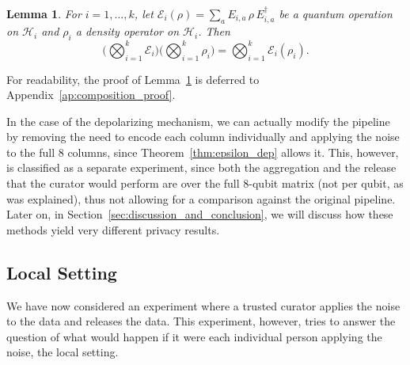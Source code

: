 \documentclass{ieeeaccess}
\newtheorem{lemma}{Lemma}[section]
\begin{document}
\begin{lemma}
  For $i = 1, \dots, k$, let $\mathcal{E}_i(\rho) = \sum_{a} E_{i,a}\, \rho\, E_{i,a}^{\dagger}$ be a quantum operation on $\mathcal{H}_i$ and $\rho_i$ a density operator on $\mathcal{H}_i$. Then
  \[
    \Big(\bigotimes_{i=1}^{k} \mathcal{E}_i\Big)\Big(\bigotimes_{i=1}^{k} \rho_i\Big) = \bigotimes_{i=1}^{k} \mathcal{E}_i(\rho_i).
  \]
  \label{lem:product_channel}
\end{lemma}

For readability, the proof of Lemma~\ref{lem:product_channel} is deferred to Appendix~\ref{ap:composition_proof}.

In the case of the depolarizing mechanism, we can actually modify the pipeline by removing the need to encode each column individually and applying the noise to the full 8 columns, since Theorem~\ref{thm:epsilon_dep} allows it. This, however, is classified as a separate experiment, since both the aggregation and the release that the curator would perform are over the full 8-qubit matrix (not per qubit, as was explained), thus not allowing for a comparison against the original pipeline. Later on, in Section~\ref{sec:discussion_and_conclusion}, we will discuss how these methods yield very different privacy results.


\subsection{Local Setting}
\label{subsec:experiment_local_setting}

We have now considered an experiment where a trusted curator applies the noise to the data and releases the data. This experiment, however, tries to answer the question of what would happen if it were each individual person applying the noise, the local setting.
\end{document}

